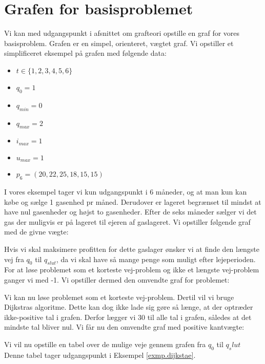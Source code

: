 \section{Grafen for basisproblemet}
Vi kan med udgangspunkt i afsnittet om grafteori opstille en graf for vores basisproblem. Grafen er en simpel, orienteret, vægtet graf. Vi opstiller et simplificeret eksempel på grafen med følgende data:
\begin{itemize}
  \item $t \in \{1,2,3,4,5,6\}$
  \item $q_{0}=1$
  \item $q_{min}=0$
  \item $q_{max}=2$
  \item $i_{max}=1$
  \item $u_{max}=1$
  \item $p_{6}=(20,22,25,18,15,15)$
\end{itemize}

I vores eksempel tager vi kun udgangspunkt i 6 måneder, og at man kun kan købe og sælge 1 gasenhed pr måned. Derudover er lageret begrænset til mindst at have nul gasenheder og højst to gasenheder. Efter de seks måneder sælger vi det gas der muligvis er på lageret til ejeren af gaslageret. Vi opstiller følgende graf med de givne vægte:



Hvis vi skal maksimere profitten for dette gaslager ønsker vi at finde den længste vej fra $q_{0}$ til $q_{slut}$, da vi skal have så mange penge som muligt efter lejeperioden. For at løse problemet som et korteste vej-problem og ikke et længste vej-problem ganger vi med -1. Vi opstiller dermed den omvendte graf for problemet:



Vi kan nu løse problemet som et korteste vej-problem. Dertil vil vi bruge Dijkstras algoritme. Dette kan dog ikke lade sig gøre så længe, at der optræder ikke-positive tal i grafen. Derfor lægger vi 30 til alle tal i grafen, således at det mindste tal bliver nul. Vi får nu den omvendte graf med positive kantvægte:




Vi vil nu opstille en tabel over de mulige veje gennem grafen fra $q_0$ til $q_slut$ Denne tabel tager udgangspunkt i Eksempel \ref{exmp.dijkstae}.

 


